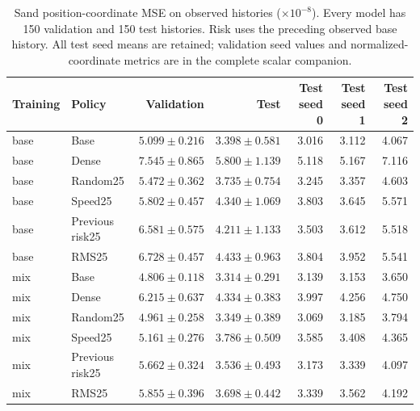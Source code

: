 \begin{table}[t]
\centering\scriptsize
\caption{Sand position-coordinate MSE on observed histories ($\times10^{-8}$). Every model has 150 validation and 150 test histories. Risk uses the preceding observed base history. All test seed means are retained; validation seed values and normalized-coordinate metrics are in the complete scalar companion.}
\label{tab:sand-all-observed}
\setlength{\tabcolsep}{3pt}
\begin{tabular}{llrrrrr}
\toprule
Training & Policy & Validation & Test & Test seed 0 & Test seed 1 & Test seed 2\\
\midrule
base & Base & $5.099\pm0.216$ & $3.398\pm0.581$ & 3.016 & 3.112 & 4.067\\
base & Dense & $7.545\pm0.865$ & $5.800\pm1.139$ & 5.118 & 5.167 & 7.116\\
base & Random25 & $5.472\pm0.362$ & $3.735\pm0.754$ & 3.245 & 3.357 & 4.603\\
base & Speed25 & $5.802\pm0.457$ & $4.340\pm1.069$ & 3.803 & 3.645 & 5.571\\
base & Previous risk25 & $6.581\pm0.575$ & $4.211\pm1.133$ & 3.503 & 3.612 & 5.518\\
base & RMS25 & $6.728\pm0.457$ & $4.433\pm0.963$ & 3.804 & 3.952 & 5.541\\
mix & Base & $4.806\pm0.118$ & $3.314\pm0.291$ & 3.139 & 3.153 & 3.650\\
mix & Dense & $6.215\pm0.637$ & $4.334\pm0.383$ & 3.997 & 4.256 & 4.750\\
mix & Random25 & $4.961\pm0.258$ & $3.349\pm0.389$ & 3.069 & 3.185 & 3.794\\
mix & Speed25 & $5.161\pm0.276$ & $3.786\pm0.509$ & 3.585 & 3.408 & 4.365\\
mix & Previous risk25 & $5.662\pm0.324$ & $3.536\pm0.493$ & 3.173 & 3.339 & 4.097\\
mix & RMS25 & $5.855\pm0.396$ & $3.698\pm0.442$ & 3.339 & 3.562 & 4.192\\
\bottomrule
\end{tabular}
\end{table}
